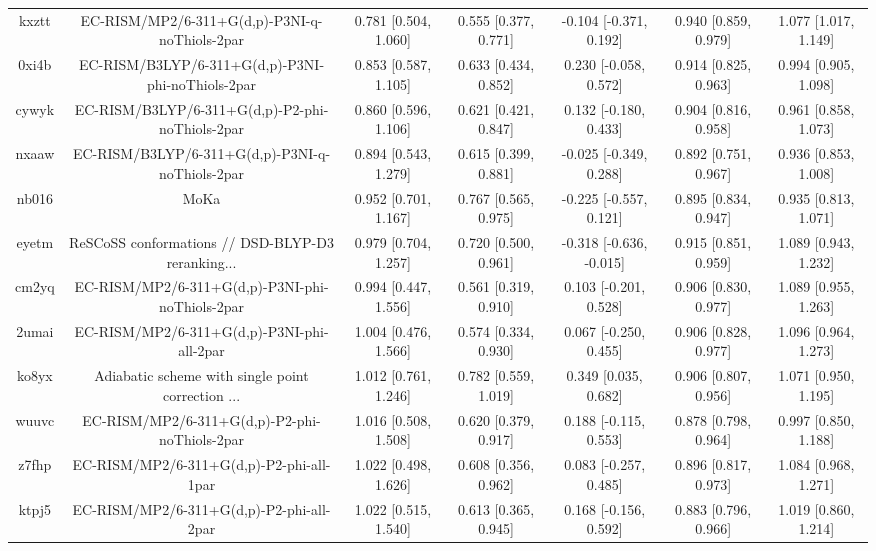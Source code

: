 \documentclass{article}
\begin{document}
\begin{center}
\begin{longtable}{|ccccccc|}
 kxztt &      EC-RISM/MP2/6-311+G(d,p)-P3NI-q-noThiols-2par &  0.781 [0.504, 1.060] &  0.555 [0.377, 0.771] &   -0.104 [-0.371, 0.192] &  0.940 [0.859, 0.979] &   1.077 [1.017, 1.149] \\
 0xi4b &  EC-RISM/B3LYP/6-311+G(d,p)-P3NI-phi-noThiols-2par &  0.853 [0.587, 1.105] &  0.633 [0.434, 0.852] &    0.230 [-0.058, 0.572] &  0.914 [0.825, 0.963] &   0.994 [0.905, 1.098] \\
 cywyk &    EC-RISM/B3LYP/6-311+G(d,p)-P2-phi-noThiols-2par &  0.860 [0.596, 1.106] &  0.621 [0.421, 0.847] &    0.132 [-0.180, 0.433] &  0.904 [0.816, 0.958] &   0.961 [0.858, 1.073] \\
 nxaaw &    EC-RISM/B3LYP/6-311+G(d,p)-P3NI-q-noThiols-2par &  0.894 [0.543, 1.279] &  0.615 [0.399, 0.881] &   -0.025 [-0.349, 0.288] &  0.892 [0.751, 0.967] &   0.936 [0.853, 1.008] \\
 nb016 &                                               MoKa &  0.952 [0.701, 1.167] &  0.767 [0.565, 0.975] &   -0.225 [-0.557, 0.121] &  0.895 [0.834, 0.947] &   0.935 [0.813, 1.071] \\
 eyetm &  ReSCoSS conformations // DSD-BLYP-D3 reranking... &  0.979 [0.704, 1.257] &  0.720 [0.500, 0.961] &  -0.318 [-0.636, -0.015] &  0.915 [0.851, 0.959] &   1.089 [0.943, 1.232] \\
 cm2yq &    EC-RISM/MP2/6-311+G(d,p)-P3NI-phi-noThiols-2par &  0.994 [0.447, 1.556] &  0.561 [0.319, 0.910] &    0.103 [-0.201, 0.528] &  0.906 [0.830, 0.977] &   1.089 [0.955, 1.263] \\
 2umai &         EC-RISM/MP2/6-311+G(d,p)-P3NI-phi-all-2par &  1.004 [0.476, 1.566] &  0.574 [0.334, 0.930] &    0.067 [-0.250, 0.455] &  0.906 [0.828, 0.977] &   1.096 [0.964, 1.273] \\
 ko8yx &  Adiabatic scheme with single point correction ... &  1.012 [0.761, 1.246] &  0.782 [0.559, 1.019] &     0.349 [0.035, 0.682] &  0.906 [0.807, 0.956] &   1.071 [0.950, 1.195] \\
 wuuvc &      EC-RISM/MP2/6-311+G(d,p)-P2-phi-noThiols-2par &  1.016 [0.508, 1.508] &  0.620 [0.379, 0.917] &    0.188 [-0.115, 0.553] &  0.878 [0.798, 0.964] &   0.997 [0.850, 1.188] \\
 z7fhp &           EC-RISM/MP2/6-311+G(d,p)-P2-phi-all-1par &  1.022 [0.498, 1.626] &  0.608 [0.356, 0.962] &    0.083 [-0.257, 0.485] &  0.896 [0.817, 0.973] &   1.084 [0.968, 1.271] \\
 ktpj5 &           EC-RISM/MP2/6-311+G(d,p)-P2-phi-all-2par &  1.022 [0.515, 1.540] &  0.613 [0.365, 0.945] &    0.168 [-0.156, 0.592] &  0.883 [0.796, 0.966] &   1.019 [0.860, 1.214] \\

\end{longtable}
\end{center}
\end{document}
